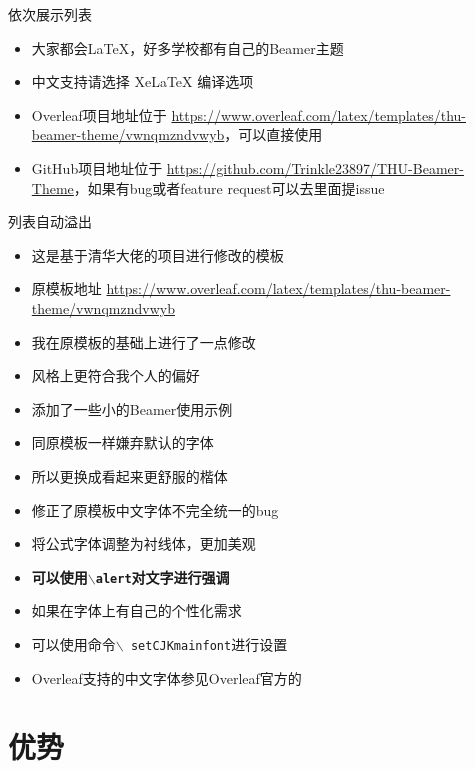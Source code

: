 \documentclass{beamer}
\renewcommand{\alert}[1]{\textbf{\color{swufe}#1}}
\def\cmd#1{\texttt{\color[RGB]{0, 0, 139}\footnotesize $\backslash$#1}}
\begin{document}
\begin{frame}{依次展示列表}
    \begin{itemize}[<+-| alert@+>] %
        \item 大家都会\LaTeX{}，好多学校都有自己的Beamer主题
        \item 中文支持请选择 Xe\LaTeX{} 编译选项
        \item Overleaf项目地址位于 \url{https://www.overleaf.com/latex/templates/thu-beamer-theme/vwnqmzndvwyb}，可以直接使用
        \item GitHub项目地址位于 \url{https://github.com/Trinkle23897/THU-Beamer-Theme}，如果有bug或者feature request可以去里面提issue
    \end{itemize}
\end{frame}

\begin{frame}[allowframebreaks]{列表自动溢出}
    \begin{itemize}
    \setlength{\itemsep}{10pt}
        \item 这是基于清华大佬的项目进行修改的模板
        \item 原模板地址 \url{https://www.overleaf.com/latex/templates/thu-beamer-theme/vwnqmzndvwyb}
        \item 我在原模板的基础上进行了一点修改
        \item 风格上更符合我个人的偏好
        \item 添加了一些小的Beamer使用示例
        \item 同原模板一样嫌弃默认的字体
        \item 所以更换成看起来更舒服的楷体
        \item 修正了原模板中文字体不完全统一的bug
        \item 将公式字体调整为衬线体，更加美观
        \item \alert{可以使用\cmd{alert}对文字进行强调}
        \item 如果在字体上有自己的个性化需求
        \item 可以使用命令\cmd{ setCJKmainfont}进行设置
        \item Overleaf支持的中文字体参见Overleaf官方的\href{https://cn.overleaf.com/learn/latex/Questions/Which_OTF_or_TTF_fonts_are_supported_via_fontspec\%3F\#Chinese}{\color{purple}{帮助文档}}

    \end{itemize}
\end{frame}

\section{优势}
\end{document}

